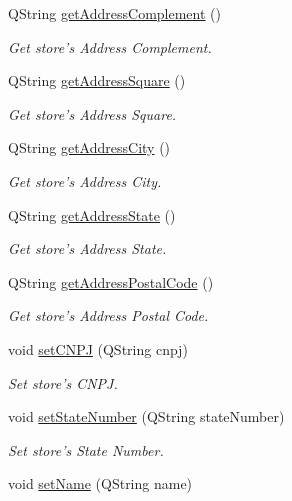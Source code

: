 \begin{DoxyCompactItemize}
\-Q\-String \hyperlink{class_store_a3e64b2238968db9741a888c0268e9273}{get\-Address\-Complement} ()
\begin{DoxyCompactList}\small\item\em \-Get store's \-Address \-Complement. \end{DoxyCompactList}\item 
\-Q\-String \hyperlink{class_store_a31d78b9bd5f6bfa6a084357bae568105}{get\-Address\-Square} ()
\begin{DoxyCompactList}\small\item\em \-Get store's \-Address \-Square. \end{DoxyCompactList}\item 
\-Q\-String \hyperlink{class_store_ad2d8c54e860cd995a06fcc7bd199e4df}{get\-Address\-City} ()
\begin{DoxyCompactList}\small\item\em \-Get store's \-Address \-City. \end{DoxyCompactList}\item 
\-Q\-String \hyperlink{class_store_a58ba32e46c0833f66e180056dcdb948e}{get\-Address\-State} ()
\begin{DoxyCompactList}\small\item\em \-Get store's \-Address \-State. \end{DoxyCompactList}\item 
\-Q\-String \hyperlink{class_store_a96fa50178e75a2c3ee939b422cc196d5}{get\-Address\-Postal\-Code} ()
\begin{DoxyCompactList}\small\item\em \-Get store's \-Address \-Postal \-Code. \end{DoxyCompactList}\item 
void \hyperlink{class_store_ae3ce6ac4ac19c2b531eaae535e6f7f2d}{set\-C\-N\-P\-J} (\-Q\-String cnpj)
\begin{DoxyCompactList}\small\item\em \-Set store's \-C\-N\-P\-J. \end{DoxyCompactList}\item 
void \hyperlink{class_store_af95f8d4f26ffb99b6dd135b4e10c4859}{set\-State\-Number} (\-Q\-String state\-Number)
\begin{DoxyCompactList}\small\item\em \-Set store's \-State \-Number. \end{DoxyCompactList}\item 
void \hyperlink{class_store_a819faf2a641c7fdd6032b0f854165949}{set\-Name} (\-Q\-String name)

\end{DoxyCompactItemize}
